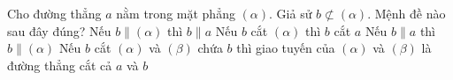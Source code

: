 \begin{ex}%
    Cho đường thẳng $a$ nằm trong mặt phẳng $(\alpha)$. Giả sử $b \not \subset(\alpha)$. Mệnh đề nào sau đây đúng?
    \choice
    {Nếu $b\parallel (\alpha)$ thì $b\parallel a$}
    {Nếu $b$ cắt $(\alpha)$ thì $b$ cắt $a$}
    {\True Nếu $b \parallel a$ thì $b \parallel (\alpha)$}
    {Nếu $b$ cắt $(\alpha)$ và $(\beta)$ chứa $b$ thì giao tuyến của $(\alpha)$ và $(\beta)$ là đường thẳng cắt cả $a$ và $b$}
\end{ex}
